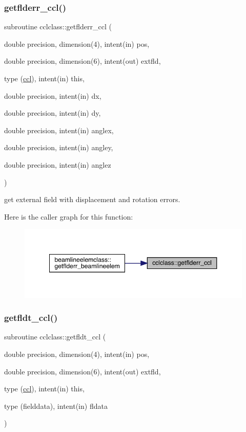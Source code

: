 \subsubsection{\texorpdfstring{getflderr\_ccl()}{getflderr\_ccl()}}
{\footnotesize\ttfamily subroutine cclclass\+::getflderr\+\_\+ccl (\begin{DoxyParamCaption}\item[{double precision, dimension(4), intent(in)}]{pos,  }\item[{double precision, dimension(6), intent(out)}]{extfld,  }\item[{type (\mbox{\hyperlink{namespacecclclass_structcclclass_1_1ccl}{ccl}}), intent(in)}]{this,  }\item[{double precision, intent(in)}]{dx,  }\item[{double precision, intent(in)}]{dy,  }\item[{double precision, intent(in)}]{anglex,  }\item[{double precision, intent(in)}]{angley,  }\item[{double precision, intent(in)}]{anglez }\end{DoxyParamCaption})}



get external field with displacement and rotation errors. 

Here is the caller graph for this function\+:\nopagebreak
\begin{figure}[H]
\begin{center}
\leavevmode
\includegraphics[width=348pt]{namespacecclclass_a4d8386891ff89c7352f001b01d5f84b5_icgraph}
\end{center}
\end{figure}
\mbox{\label{namespacecclclass_a4b07c783aa0e272c4924db67320c70d3}} 
\subsubsection{\texorpdfstring{getfldt\_ccl()}{getfldt\_ccl()}}
{\footnotesize\ttfamily subroutine cclclass\+::getfldt\+\_\+ccl (\begin{DoxyParamCaption}\item[{double precision, dimension(4), intent(in)}]{pos,  }\item[{double precision, dimension(6), intent(out)}]{extfld,  }\item[{type (\mbox{\hyperlink{namespacecclclass_structcclclass_1_1ccl}{ccl}}), intent(in)}]{this,  }\item[{type (fielddata), intent(in)}]{fldata }\end{DoxyParamCaption})}



